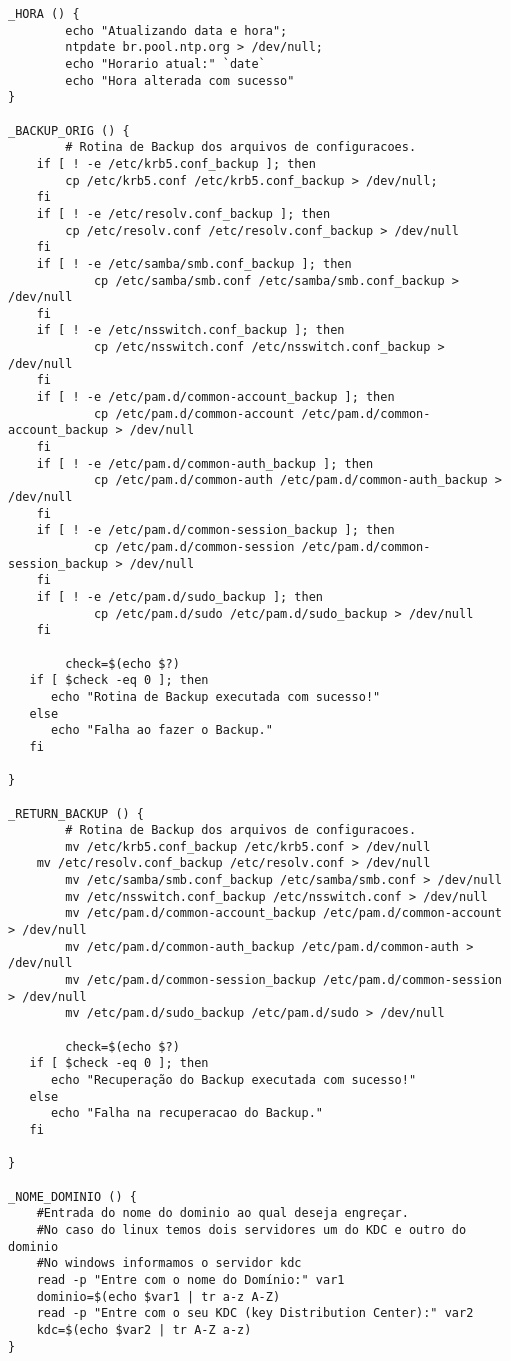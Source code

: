 \begin{lstlisting}
_HORA () {
        echo "Atualizando data e hora";
        ntpdate br.pool.ntp.org > /dev/null;
        echo "Horario atual:" `date`
        echo "Hora alterada com sucesso"
}
 
_BACKUP_ORIG () {
        # Rotina de Backup dos arquivos de configuracoes.
	if [ ! -e /etc/krb5.conf_backup ]; then
		cp /etc/krb5.conf /etc/krb5.conf_backup > /dev/null;
	fi
	if [ ! -e /etc/resolv.conf_backup ]; then
		cp /etc/resolv.conf /etc/resolv.conf_backup > /dev/null
	fi
	if [ ! -e /etc/samba/smb.conf_backup ]; then
        	cp /etc/samba/smb.conf /etc/samba/smb.conf_backup > /dev/null
	fi
	if [ ! -e /etc/nsswitch.conf_backup ]; then
        	cp /etc/nsswitch.conf /etc/nsswitch.conf_backup > /dev/null
	fi
	if [ ! -e /etc/pam.d/common-account_backup ]; then
	        cp /etc/pam.d/common-account /etc/pam.d/common-account_backup > /dev/null
	fi
	if [ ! -e /etc/pam.d/common-auth_backup ]; then
	        cp /etc/pam.d/common-auth /etc/pam.d/common-auth_backup > /dev/null
	fi
	if [ ! -e /etc/pam.d/common-session_backup ]; then
	        cp /etc/pam.d/common-session /etc/pam.d/common-session_backup > /dev/null
	fi
	if [ ! -e /etc/pam.d/sudo_backup ]; then
	        cp /etc/pam.d/sudo /etc/pam.d/sudo_backup > /dev/null
	fi
         
        check=$(echo $?)
   if [ $check -eq 0 ]; then
      echo "Rotina de Backup executada com sucesso!"
   else
      echo "Falha ao fazer o Backup."
   fi
         
}

_RETURN_BACKUP () {
        # Rotina de Backup dos arquivos de configuracoes.
        mv /etc/krb5.conf_backup /etc/krb5.conf > /dev/null
	mv /etc/resolv.conf_backup /etc/resolv.conf > /dev/null
        mv /etc/samba/smb.conf_backup /etc/samba/smb.conf > /dev/null
        mv /etc/nsswitch.conf_backup /etc/nsswitch.conf > /dev/null
        mv /etc/pam.d/common-account_backup /etc/pam.d/common-account > /dev/null
        mv /etc/pam.d/common-auth_backup /etc/pam.d/common-auth > /dev/null
        mv /etc/pam.d/common-session_backup /etc/pam.d/common-session > /dev/null
        mv /etc/pam.d/sudo_backup /etc/pam.d/sudo > /dev/null
         
        check=$(echo $?)
   if [ $check -eq 0 ]; then
      echo "Recuperação do Backup executada com sucesso!"
   else
      echo "Falha na recuperacao do Backup."
   fi
         
}
 
_NOME_DOMINIO () {
    #Entrada do nome do dominio ao qual deseja engreçar.
	#No caso do linux temos dois servidores um do KDC e outro do dominio
	#No windows informamos o servidor kdc
    read -p "Entre com o nome do Domínio:" var1
    dominio=$(echo $var1 | tr a-z A-Z)
    read -p "Entre com o seu KDC (key Distribution Center):" var2
    kdc=$(echo $var2 | tr A-Z a-z)         
}


\end{lstlisting}
